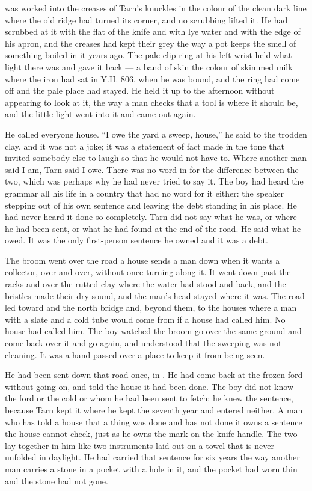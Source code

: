  was worked into the creases of Tarn's knuckles in the colour of the clean dark line where the old ridge had turned its corner, and no scrubbing lifted it. He had scrubbed at it with the flat of the knife and with lye water and with the edge of his apron, and the creases had kept their grey the way a pot keeps the smell of something boiled in it years ago. The pale clip-ring at his left wrist held what light there was and gave it back --- a band of skin the colour of skimmed milk where the iron had sat in Y.H. 806, when he was bound, and the ring had come off and the pale place had stayed. He held it up to the afternoon without appearing to look at it, the way a man checks that a tool is where it should be, and the little light went into it and came out again.

He called everyone house. “I owe the yard a sweep, house,” he said to the trodden clay, and it was not a joke; it was a statement of fact made in the tone that invited somebody else to laugh so that he would not have to. Where another man said I am, Tarn said I owe. There was no word in  for the difference between the two, which was perhaps why he had never tried to say it. The boy had heard the grammar all his life in a country that had no word for it either: the speaker stepping out of his own sentence and leaving the debt standing in his place. He had never heard it done so completely. Tarn did not say what he was, or where he had been sent, or what he had found at the end of the road. He said what he owed. It was the only first-person sentence he owned and it was a debt.

\scenebreak

The broom went over the road a house sends a man down when it wants a collector, over and over, without once turning along it. It went down past the racks and over the rutted clay where the water had stood and back, and the bristles made their dry sound, and the man's head stayed where it was. The road led toward  and the north bridge and, beyond them, to the houses where a man with a slate and a cold tube would come from if a house had called him. No house had called him. The boy watched the broom go over the same ground and come back over it and go again, and understood that the sweeping was not cleaning. It was a hand passed over a place to keep it from being seen.

He had been sent down that road once, in . He had come back at the frozen ford without going on, and told the house it had been done. The boy did not know the ford or the cold or whom he had been sent to fetch; he knew the sentence, because Tarn kept it where he kept the seventh year and entered neither. A man who has told a house that a thing was done and has not done it owns a sentence the house cannot check, just as he owns the mark on the knife handle. The two lay together in him like two instruments laid out on a towel that is never unfolded in daylight. He had carried that sentence for six years the way another man carries a stone in a pocket with a hole in it, and the pocket had worn thin and the stone had not gone.

